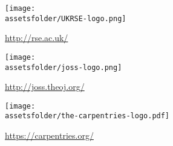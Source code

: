 \documentclass{beamer}
\newcommand{\assetsfolder}{./assets}
\begin{document}
	\begin{frame}
	   \begin{center}
		   \texttt{[image: \\assetsfolder/UKRSE-logo.png]}

			\url{http://rse.ac.uk/}
	   \end{center}

    \end{frame}

	\begin{frame}
	   \begin{center}
           \texttt{[image: \\assetsfolder/joss-logo.png]}

			\url{http://joss.theoj.org/}
	   \end{center}


	\end{frame}

	\begin{frame}
	   \begin{center}
		   \texttt{[image: \\assetsfolder/the-carpentries-logo.pdf]}

			\url{https://carpentries.org/}
	   \end{center}

	\end{frame}
\end{document}
